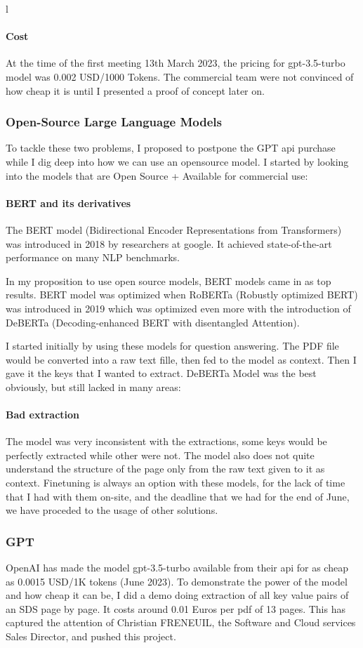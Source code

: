 l\documentclass[a4paper,12pt,twoside]{report}
\begin{document}
\paragraph{Cost}
At the time of the first meeting 13th March 2023, the pricing for gpt-3.5-turbo model was 0.002 USD/1000 Tokens. The commercial team were not convinced of how cheap it is until I presented a proof of concept later on.
\subsubsection{Open-Source Large Language Models}
To tackle these two problems, I proposed to postpone the GPT api purchase while I dig deep into how we can use an opensource model. I started by looking into the models that are Open Source + Available for commercial use:
\paragraph{BERT and its derivatives}
The BERT model \cite{devlin2019bert} (Bidirectional Encoder Representations from Transformers) was introduced in 2018 by researchers at google. It achieved state-of-the-art performance on many NLP benchmarks. 

In my proposition to use open source models, BERT models came in as top results. BERT model was optimized when RoBERTa\cite{liu2019roberta} (Robustly optimized BERT) was introduced in 2019 which was optimized even more with the introduction of DeBERTa \cite{he2021deberta} (Decoding-enhanced BERT with disentangled Attention).

I started initially by using these models for question answering. The PDF file would be converted into a raw text fille, then fed to the model as context. Then I gave it the keys that I wanted to extract. DeBERTa Model was the best obviously, but still lacked in many areas:
\paragraph{Bad extraction}
The model was very inconsistent with the extractions, some keys would be perfectly extracted while other were not. The model also does not quite understand the structure of the page only from the raw text given to it as context.
Finetuning is always an option with these models, for the lack of time that I had with them on-site, and the deadline that we had for the end of June, we have proceded to the usage of other solutions.
\subsubsection{GPT}
OpenAI has made the model gpt-3.5-turbo available from their api for as cheap as 0.0015 USD/1K tokens (June 2023). To demonstrate the power of the model and how cheap it can be, I did a demo doing extraction of all key value pairs of an SDS page by page. It costs around 0.01 Euros per pdf of 13 pages. This has captured the attention of Christian FRENEUIL, the Software and Cloud services Sales Director, and pushed this project. 
\end{document}
